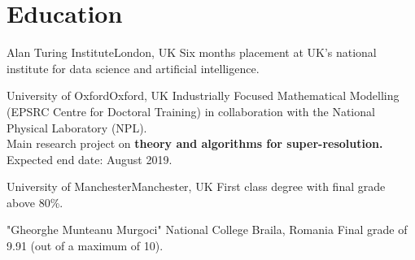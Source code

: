 \documentclass[11pt,a4paper,roman]{moderncv} %
\begin{document}


\section{Education}

        {Alan Turing Institute}{London, UK}{}
        {
          Six months placement at UK's national institute for
          data science and artificial intelligence.
        }

        {University of Oxford}{Oxford, UK}{}
        {
          Industrially Focused Mathematical Modelling 
          (EPSRC Centre for Doctoral Training) 
          in collaboration with the National Physical Laboratory (NPL). 
          \\
          Main research project on \textbf{theory and algorithms for super-resolution.}
          \\ 
          Expected end date: August 2019.
        }

        {University of Manchester}{Manchester, UK}{}
        {
          First class degree with final grade above 80\%.
        }
  
        {"Gheorghe Munteanu Murgoci" National College}
        {Braila, Romania}{}
        {Final grade of 9.91 (out of a maximum of 10).}


\end{document}
